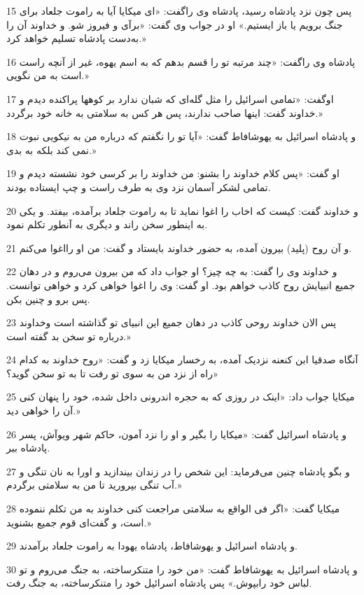 \par 15 پس چون نزد پادشاه رسید، پادشاه وی راگفت: «ای میکایا آیا به راموت جلعاد برای جنگ برویم یا باز ایستیم.» او در جواب وی گفت: «برآی و فیروز شو. و خداوند آن را به‌دست پادشاه تسلیم خواهد کرد.»
\par 16 پادشاه وی راگفت: «چند مرتبه تو را قسم بدهم که به اسم یهوه، غیر از آنچه راست است به من نگویی.»
\par 17 اوگفت: «تمامی اسرائیل را مثل گله‌ای که شبان ندارد بر کوهها پراکنده دیدم و خداوند گفت: اینها صاحب ندارند، پس هر کس به سلامتی به خانه خود برگردد.»
\par 18 و پادشاه اسرائیل به یهوشافاط گفت: «آیا تو را نگفتم که درباره من به نیکویی نبوت نمی کند بلکه به بدی.»
\par 19 او گفت: «پس کلام خداوند را بشنو: من خداوند را بر کرسی خود نشسته دیدم و تمامی لشکر آسمان نزد وی به طرف راست و چپ ایستاده بودند.
\par 20 و خداوند گفت: کیست که اخاب را اغوا نماید تا به راموت جلعاد برآمده، بیفتد. و یکی به اینطور سخن راند و دیگری به آنطور تکلم نمود.
\par 21 و آن روح (پلید) بیرون آمده، به حضور خداوند بایستاد و گفت: من او رااغوا می‌کنم.
\par 22 و خداوند وی را گفت: به چه چیز؟ او جواب داد که من بیرون می‌روم و در دهان جمیع انبیایش روح کاذب خواهم بود. او گفت: وی را اغوا خواهی کرد و خواهی توانست. پس برو و چنین بکن.
\par 23 پس الان خداوند روحی کاذب در دهان جمیع این انبیای تو گذاشته است وخداوند درباره تو سخن بد گفته است.»
\par 24 آنگاه صدقیا ابن کنعنه نزدیک آمده، به رخسار میکایا زد و گفت: «روح خداوند به کدام راه از نزد من به سوی تو رفت تا به تو سخن گوید؟»
\par 25 میکایا جواب داد: «اینک در روزی که به حجره اندرونی داخل شده، خود را پنهان کنی آن را خواهی دید.»
\par 26 و پادشاه اسرائیل گفت: «میکایا را بگیر و او را نزد آمون، حاکم شهر ویوآش، پسر پادشاه ببر.
\par 27 و بگو پادشاه چنین می‌فرماید: این شخص را در زندان بیندازید و اورا به نان تنگی و آب تنگی بپرورید تا من به سلامتی برگردم.»
\par 28 میکایا گفت: «اگر فی الواقع به سلامتی مراجعت کنی خداوند به من تکلم ننموده است، و گفت‌ای قوم جمیع بشنوید.»
\par 29 و پادشاه اسرائیل و یهوشافاط، پادشاه یهودا به راموت جلعاد برآمدند.
\par 30 و پادشاه اسرائیل به یهوشافاط گفت: «من خود را متنکرساخته، به جنگ می‌روم و تو لباس خود رابپوش.» پس پادشاه اسرائیل خود را متنکرساخته، به جنگ رفت.
